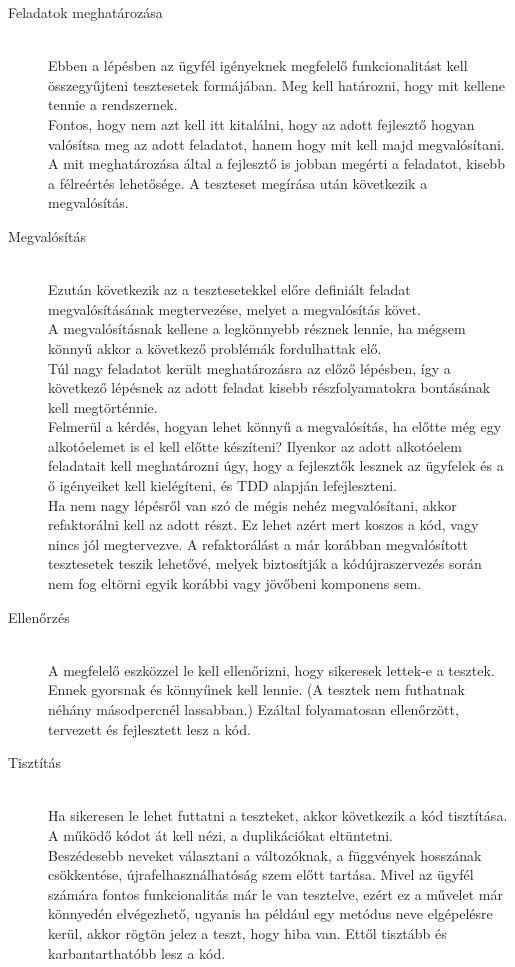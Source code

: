 \begin{description}
\item[Feladatok meghatározása]\hfill\\
     Ebben a lépésben az ügyfél igényeknek megfelelő funkcionalitást kell összegyűjteni tesztesetek formájában. Meg kell határozni, hogy mit kellene tennie a rendszernek.\hfill\\
     Fontos, hogy nem azt kell itt kitalálni, hogy az adott fejlesztő hogyan valósítsa meg az adott feladatot, hanem hogy mit kell majd megvalósítani. A mit meghatározása által a fejlesztő is jobban megérti a feladatot, kisebb a félreértés lehetősége. A teszteset megírása után következik a megvalósítás.
\hfill\\
\item[Megvalósítás]\hfill\\
     Ezután következik az a tesztesetekkel előre definiált feladat megvalósításának megtervezése, melyet a megvalósítás követ.\hfill\\
     A megvalósításnak kellene a legkönnyebb résznek lennie, ha mégsem könnyű akkor a következő problémák fordulhattak elő. \\
Túl nagy feladatot került meghatározásra az előző lépésben, így a következő lépésnek az adott feladat kisebb részfolyamatokra bontásának kell megtörténnie.\\
Felmerül a kérdés, hogyan lehet könnyű a megvalósítás, ha előtte még egy alkotóelemet is el kell előtte készíteni? Ilyenkor az adott alkotóelem feladatait kell meghatározni úgy, hogy a fejlesztők lesznek az ügyfelek és a ő igényeiket kell kielégíteni, és TDD alapján lefejleszteni.\\
Ha nem nagy lépésről van szó de mégis nehéz megvalósítani, akkor refaktorálni kell az adott részt. Ez lehet azért mert koszos a kód, vagy nincs jól megtervezve. A refaktorálást a már korábban megvalósított tesztesetek teszik lehetővé, melyek biztosítják a kódújraszervezés során nem fog eltörni egyik korábbi vagy jövőbeni komponens sem.
\hfill\\
\item[Ellenőrzés]\hfill\\
     A megfelelő eszközzel le kell ellenőrizni, hogy sikeresek lettek-e a tesztek. Ennek gyorsnak és könnyűnek kell lennie. (A tesztek nem futhatnak néhány másodpercnél lassabban.) Ezáltal folyamatosan ellenőrzött, tervezett és fejlesztett lesz a kód.
\hfill\\
\item[Tisztítás]\hfill\\
Ha sikeresen le lehet futtatni a teszteket, akkor következik a kód tisztítása. A működő kódot át kell nézi, a duplikációkat eltüntetni.\\ Beszédesebb neveket választani a változóknak, a függvények hosszának csökkentése, újrafelhasználhatóság szem előtt tartása. Mivel az ügyfél számára fontos funkcionalitás már le van tesztelve, ezért ez a művelet már könnyedén elvégezhető, ugyanis ha például egy metódus neve elgépelésre kerül, akkor rögtön jelez a teszt, hogy hiba van. Ettől tisztább és karbantarthatóbb lesz a kód.
\end{description}

